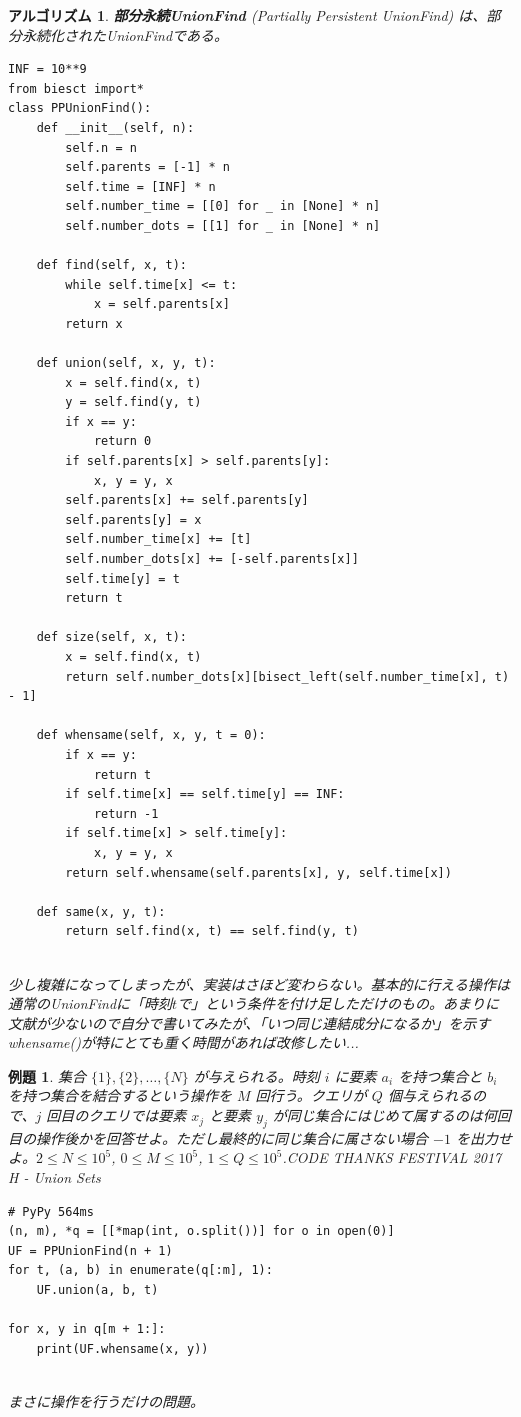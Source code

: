 \documentclass[12pt, a4j]{ltjsarticle}
\newtheorem{alg}[thm]{アルゴリズム}
\newtheorem{exm}[thm]{例題}
\begin{document}
\begin{alg} {\bf 部分永続UnionFind} (Partially Persistent UnionFind) は、部分永続化されたUnionFindである。\\\upshape
\begin{lstlisting}
INF = 10**9
from biesct import*
class PPUnionFind():
    def __init__(self, n):
        self.n = n
        self.parents = [-1] * n
        self.time = [INF] * n
        self.number_time = [[0] for _ in [None] * n]
        self.number_dots = [[1] for _ in [None] * n]

    def find(self, x, t):
        while self.time[x] <= t:
            x = self.parents[x]
        return x

    def union(self, x, y, t):
        x = self.find(x, t)
        y = self.find(y, t)
        if x == y:
            return 0
        if self.parents[x] > self.parents[y]:
            x, y = y, x
        self.parents[x] += self.parents[y]
        self.parents[y] = x
        self.number_time[x] += [t]
        self.number_dots[x] += [-self.parents[x]]
        self.time[y] = t
        return t

    def size(self, x, t):
        x = self.find(x, t)
        return self.number_dots[x][bisect_left(self.number_time[x], t) - 1]

    def whensame(self, x, y, t = 0):
        if x == y:
            return t
        if self.time[x] == self.time[y] == INF:
            return -1
        if self.time[x] > self.time[y]:
            x, y = y, x
        return self.whensame(self.parents[x], y, self.time[x])

    def same(x, y, t):
        return self.find(x, t) == self.find(y, t)
\end{lstlisting}\quad\\
少し複雑になってしまったが、実装はさほど変わらない。基本的に行える操作は通常のUnionFindに「時刻$t$で」という条件を付け足しただけのもの。あまりに文献が少ないので自分で書いてみたが、「いつ同じ連結成分になるか」を示すwhensame()が特にとても重く時間があれば改修したい...
\end{alg}

\newpage

\begin{exm} 集合 $\{1\},\{2\},\ldots,\{N\}$ が与えられる。時刻 $i$ に要素 $a_i$ を持つ集合と $b_i$ を持つ集合を結合するという操作を $M$ 回行う。クエリが $Q$ 個与えられるので、$j$ 回目のクエリでは要素 $x_j$ と要素 $y_j$ が同じ集合にはじめて属するのは何回目の操作後かを回答せよ。ただし最終的に同じ集合に属さない場合 $-1$ を出力せよ。$2\le N\le 10^5$, $0\le M\le 10^5$, $1\le Q\le 10^5$.\upshape\quad CODE THANKS FESTIVAL 2017 H - Union Sets\\
\begin{lstlisting}
# PyPy 564ms
(n, m), *q = [[*map(int, o.split())] for o in open(0)]
UF = PPUnionFind(n + 1)
for t, (a, b) in enumerate(q[:m], 1):
    UF.union(a, b, t)

for x, y in q[m + 1:]:
    print(UF.whensame(x, y))
\end{lstlisting}\quad\\
まさに操作を行うだけの問題。
\end{exm}
\end{document}
